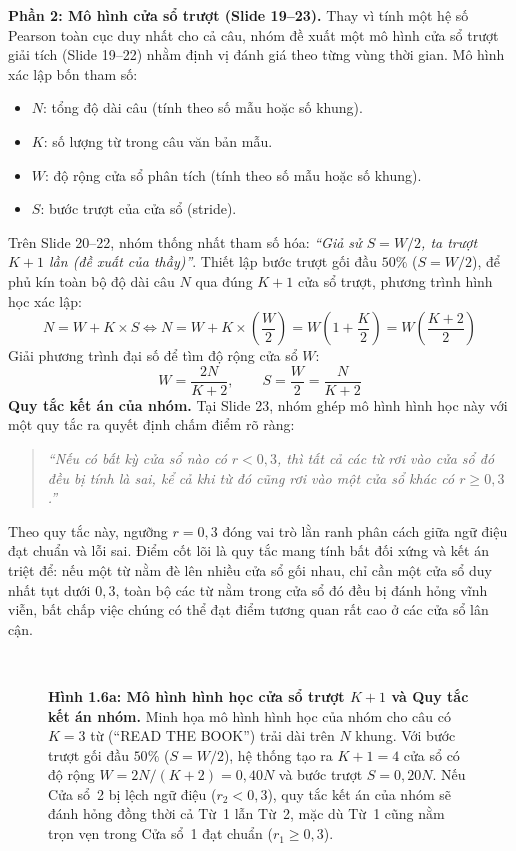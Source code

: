 \documentclass[11pt,a4paper]{article}
\begin{document}
\textbf{Phần 2: Mô hình cửa sổ trượt (Slide 19--23).} Thay vì tính một hệ số Pearson toàn cục duy nhất cho cả câu, nhóm đề xuất một mô hình cửa sổ trượt giải tích (Slide 19--22) nhằm định vị đánh giá theo từng vùng thời gian. Mô hình xác lập bốn tham số:
\begin{itemize}
    \item $N$: tổng độ dài câu (tính theo số mẫu hoặc số khung).
    \item $K$: số lượng từ trong câu văn bản mẫu.
    \item $W$: độ rộng cửa sổ phân tích (tính theo số mẫu hoặc số khung).
    \item $S$: bước trượt của cửa sổ (stride).
\end{itemize}
Trên Slide 20--22, nhóm thống nhất tham số hóa: \textit{``Giả sử $S = W / 2$, ta trượt $K + 1$ lần (đề xuất của thầy)''}. Thiết lập bước trượt gối đầu $50\%$ ($S = W/2$), để phủ kín toàn bộ độ dài câu $N$ qua đúng $K+1$ cửa sổ trượt, phương trình hình học xác lập:
\begin{equation}
N = W + K \times S \iff N = W + K \times \left(\frac{W}{2}\right) = W \left(1 + \frac{K}{2}\right) = W \left(\frac{K+2}{2}\right)
\end{equation}
Giải phương trình đại số để tìm độ rộng cửa sổ $W$:
\begin{equation}
W = \frac{2N}{K+2}, \qquad S = \frac{W}{2} = \frac{N}{K+2}
\label{eq:window_sizing}
\end{equation}
\textbf{Quy tắc kết án của nhóm.} Tại Slide 23, nhóm ghép mô hình hình học này với một quy tắc ra quyết định chấm điểm rõ ràng:
\begin{quote}
\textit{``Nếu có bất kỳ cửa sổ nào có $r < 0{,}3$, thì tất cả các từ rơi vào cửa sổ đó đều bị tính là sai, kể cả khi từ đó cũng rơi vào một cửa sổ khác có $r \ge 0{,}3$.''}
\end{quote}
Theo quy tắc này, ngưỡng $r = 0{,}3$ đóng vai trò lằn ranh phân cách giữa ngữ điệu đạt chuẩn và lỗi sai. Điểm cốt lõi là quy tắc mang tính bất đối xứng và kết án triệt để: nếu một từ nằm đè lên nhiều cửa sổ gối nhau, chỉ cần một cửa sổ duy nhất tụt dưới $0{,}3$, toàn bộ các từ nằm trong cửa sổ đó đều bị đánh hỏng vĩnh viễn, bất chấp việc chúng có thể đạt điểm tương quan rất cao ở các cửa sổ lân cận.

\begin{figure}[htbp]
\centering
\resizebox{0.92\textwidth}{!}{}\\[3pt]
\caption{\textbf{Hình 1.6a: Mô hình hình học cửa sổ trượt $K+1$ và Quy tắc kết án nhóm.} Minh họa mô hình hình học của nhóm cho câu có $K = 3$ từ (``READ THE BOOK'') trải dài trên $N$ khung. Với bước trượt gối đầu $50\%$ ($S = W/2$), hệ thống tạo ra $K+1 = 4$ cửa sổ có độ rộng $W = 2N/(K+2) = 0{,}40N$ và bước trượt $S = 0{,}20N$. Nếu Cửa sổ~2 bị lệch ngữ điệu ($r_2 < 0{,}3$), quy tắc kết án của nhóm sẽ đánh hỏng đồng thời cả Từ~1 lẫn Từ~2, mặc dù Từ~1 cũng nằm trọn vẹn trong Cửa sổ~1 đạt chuẩn ($r_1 \ge 0{,}3$).}
\label{fig:1_6a}
\end{figure}
\end{document}
